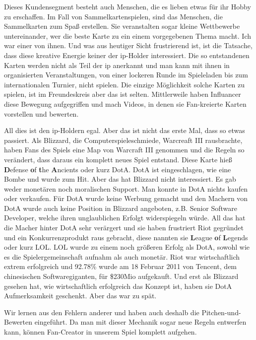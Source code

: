 \documentclass[fontsize=12, a4aper]{scrartcl}
\begin{document}
Dieses Kundensegment besteht auch Menschen, die es lieben etwas für ihr Hobby zu erschaffen. Im Fall von Sammelkartenspielen, sind das Menschen, die Sammelkarten zum Spaß erstellen. Sie veranstalten sogar kleine Wettbewerbe untereinander, wer die beste Karte zu ein einem vorgegebenen Thema macht. Ich war einer von ihnen. Und was aus heutiger Sicht frustrierend ist, ist die Tatsache, dass diese kreative Energie keiner der \ac{ip}-Holder interessiert. Die so entstandenen Karten werden nicht als Teil der \ac{ip} anerkannt und man kann mit ihnen in organisierten Veranstaltungen, von einer lockeren Runde im Spieleladen bis zum internationalen Turnier, nicht spielen. Die einzige Möglichkeit solche Karten zu spielen, ist im Freundeskreis aber das ist selten. Mittlerweile haben Influancer diese Bewegung aufgegriffen und mach Videos, in denen sie Fan-kreierte Karten vorstellen und bewerten.\hfill\newline

\noindent All dies ist den \ac{ip}-Holdern egal. Aber das ist nicht das erste Mal, dass so etwas passiert. Als Blizzard, die Computerspieleschmiede, Warcreaft III rausbrachte, haben Fans des Spiels eine Map von Warcraft III genommen und die Regeln so verändert, dass daraus ein komplett neues Spiel entstand. Diese Karte hieß \glqq \textbf{D}efense \textbf{o}f \textbf{t}he \textbf{A}ncients\grqq{} oder kurz DotA. DotA ist eingeschlagen, wie eine Bombe und wurde zum Hit. Aber das hat Blizzard nicht interessiert. Es gab weder monetären noch moralischen Support. Man konnte in DotA nichts kaufen oder verkaufen. Für DotA wurde keine Werbung gemacht und den Machern von DotA wurde auch keine Position in Blizzard angeboten, z.B. Senior Software Developer, welche ihren unglaublichen Erfolgt widerspiegeln würde. All das hat die Macher hinter DotA sehr verärgert und sie haben frustriert Riot gegründet und ein Konkurrenzprodukt raus gebracht, diese nannten sie \glqq \textbf{L}eague \textbf{o}f \textbf{L}egends\grqq{} oder kurz LOL. LOL wurde zu einem noch größeren Erfolg als DotA, sowohl wie es die Spielergemeinschaft aufnahm als auch monetär. Riot war wirtschaftlich extrem erfolgreich und 92.78\% wurde am 18 Februar 2011 von Tencent, dem chinesischen Softwaregiganten, für \$230Mio aufgekauft. Und erst als Blizzard gesehen hat, wie wirtschaftlich erfolgreich das Konzept ist, haben sie DotA Aufmerksamkeit geschenkt. Aber das war zu spät.\hfill\newline

\noindent Wir lernen aus den Fehlern anderer und haben auch deshalb die Pitchen-und-Bewerten eingeführt. Da man mit dieser Mechanik sogar neue Regeln entwerfen kann, können Fan-Creator in unserem Spiel komplett aufgehen.\hfill\newline
\end{document}
